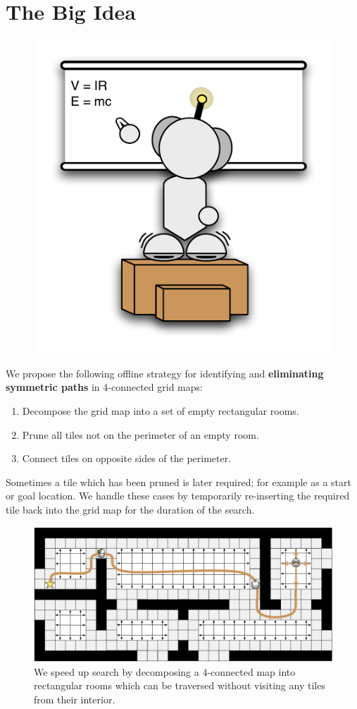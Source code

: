 \section{The Big Idea}
 \begin{figure}
		\includegraphics[width=0.25\columnwidth, trim=10mm 10mm 10mm 10mm]{diagrams/robot_whiteboard.pdf}
 \end{figure}
We propose the following offline strategy for identifying and \textbf{eliminating
symmetric paths} in 4-connected grid maps:
\begin{enumerate}
\item{Decompose the grid map into a set of empty rectangular rooms.}
\item{Prune all tiles not on the perimeter of an empty room.}
\item{Connect tiles on opposite sides of the perimeter.}
\end{enumerate}
Sometimes a tile which has been pruned is later required; for example as a start
or goal location. 
We handle these cases by temporarily re-inserting the 
required tile back into the grid map for the duration of the search.

\begin{figure}[t]
\hspace{0.35in}
\begin{minipage}{17in}
\label{fig:splash}
\begin{center}
\includegraphics[width=17in]{diagrams/robot_map.pdf}
\caption{We speed up search by decomposing a 4-connected map into rectangular
rooms which can be traversed without visiting any tiles from their interior.} 
\end{center}
\end{minipage}
\vspace{2em}
\end{figure}
